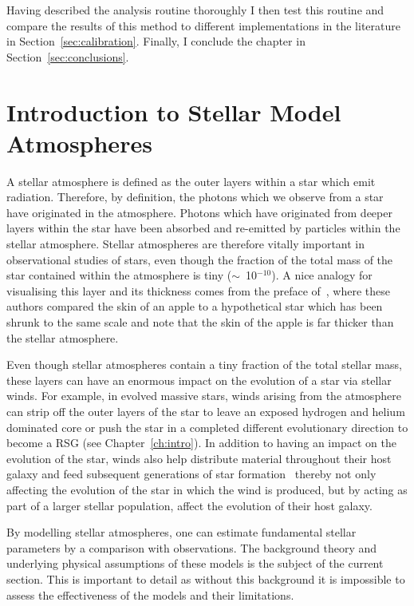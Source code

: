 Having described the analysis routine thoroughly I then test this routine and compare the results of this method to different implementations in the literature in Section~\ref{sec:calibration}.
Finally, I conclude the chapter in Section~\ref{sec:conclusions}.

\section{Introduction to Stellar Model Atmospheres} %
\label{sec:model_atmospheres}

A stellar atmosphere is defined as the outer layers within a star which emit radiation.
Therefore, by definition, the photons which we observe from a star have originated in the atmosphere.
Photons which have originated from deeper layers within the star have been absorbed and re-emitted by particles within the stellar atmosphere.
Stellar atmospheres are therefore vitally important in observational studies of stars, even though the fraction of the total mass of the star contained within the atmosphere is tiny ($\sim$~10$^{-10}$).
A nice analogy for visualising this layer and its thickness comes from the preface of~\cite{1989isa2.book.....B}, where these authors compared the skin of an apple to a hypothetical star which has been shrunk to the same scale and note that the skin of the apple is far thicker than the stellar atmosphere.


Even though stellar atmospheres contain a tiny fraction of the total stellar mass, these layers can have an enormous impact on the evolution of a star via stellar winds.
For example, in evolved massive stars, winds arising from the atmosphere can strip off the outer layers of the star to leave an exposed hydrogen and helium dominated core or push the star in a completed different evolutionary direction to become a RSG (see Chapter~\ref{ch:intro}).
In addition to having an impact on the evolution of the star, winds also help distribute material throughout their host galaxy and feed subsequent generations of star formation~\citep[e.g.][]{2011MNRAS.417..950H,2012MNRAS.421.3522H} thereby not only affecting the evolution of the star in which the wind is produced, but by acting as part of a larger stellar population, affect the evolution of their host galaxy.

By modelling stellar atmospheres, one can estimate fundamental stellar parameters by a comparison with observations.
The background theory and underlying physical assumptions of these models is the subject of the current section.
This is important to detail as without this background it is impossible to assess the effectiveness of the models and their limitations.

